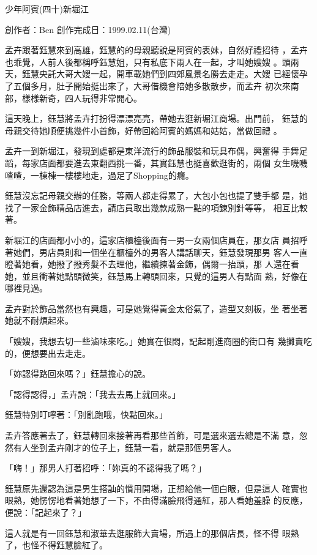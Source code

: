 



少年阿賓(四十)新堀江

創作者：Ben
創作完成日：1999.02.11(台灣)


孟卉跟著鈺慧來到高雄，鈺慧的的母親聽說是阿賓的表妹，自然好禮招待
，孟卉也乖覺，人前人後都稱呼鈺慧姐，只有私底下兩人在一起，才叫她嫂嫂
。頭兩天，鈺慧央託大哥大嫂一起，開車載她們到四郊風景名勝去走走。大嫂
已經懷孕了五個多月，肚子開始挺出來了，大哥借機會陪她多散散步，而孟卉
初次來南部，樣樣新奇，四人玩得非常開心。

這天晚上，鈺慧將孟卉打扮得漂漂亮亮，帶她去逛新堀江商場。出門前，
鈺慧的母親交待她順便挑幾件小首飾，好帶回給阿賓的媽媽和姑姑，當做回禮
。

孟卉一到新堀江，發現到處都是東洋流行的飾品服裝和玩具布偶，興奮得
手舞足蹈，每家店面都要進去東翻西挑一番，其實鈺慧也挺喜歡逛街的，兩個
女生嘰嘰喳喳，一棟棟一樓樓地走，過足了Shopping的癮。

鈺慧沒忘記母親交辦的任務，等兩人都走得累了，大包小包也提了雙手都
是，她找了一家金飾精品店進去，請店員取出幾款成熟一點的項鍊別針等等，
相互比較著。

新堀江的店面都小小的，這家店櫃檯後面有一男一女兩個店員在，那女店
員招呼著她們，男店員則和一個坐在櫃檯外的男客人講話聊天，鈺慧發現那男
客人一直瞪著她看，她撥了撥秀髮不去理他，繼續揀著金飾，偶爾一抬頭，那
人還在看她，並且衝著她點頭微笑，鈺慧馬上轉頭回來，只覺的這男人有點面
熟，好像在哪裡見過。

孟卉對於飾品當然也有興趣，可是她覺得黃金太俗氣了，造型又刻板，坐
著坐著她就不耐煩起來。

「嫂嫂，我想去切一些滷味來吃。」她實在很悶，記起剛進商圈的街口有
幾攤賣吃的，便想要出去走走。

「妳認得路回來嗎？」鈺慧擔心的說。

「認得認得，」孟卉說：「我去去馬上就回來。」

鈺慧特別叮嚀著：「別亂跑哦，快點回來。」

孟卉答應著去了，鈺慧轉回來接著再看那些首飾，可是選來選去總是不滿
意，忽然有人坐到孟卉剛才的位子上，鈺慧一看，就是那個男客人。

「嗨！」那男人打著招呼：「妳真的不認得我了嗎？」

鈺慧原先還認為這是男生搭訕的慣用開場，正想給他一個白眼，但是這人
確實也眼熟，她愣愣地看著她想了一下，不由得滿臉飛得通紅，那人看她羞臊
的反應，便說：「記起來了？」

這人就是有一回鈺慧和淑華去逛服飾大賣場，所遇上的那個店長，怪不得
眼熟了，也怪不得鈺慧臉紅了。

